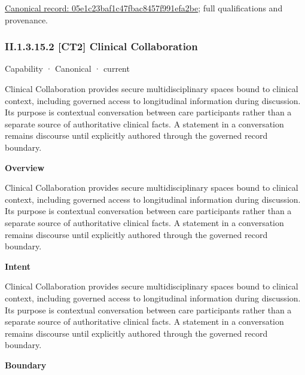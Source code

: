 {\footnotesize \href{../../../../continuum/strategy/capability/feature/05e1c23baf1c47fbac8457f991efa2be.md}{Canonical record: 05e1c23baf1c47fbac8457f991efa2be}; full qualifications and provenance.}\par
\subsubsection*{II.1.3.15.2 [CT2] Clinical Collaboration}
\label{navigation:II.1.3.15.2}

\label{element:e6429225463a44d39f82e490e254e5d4}
{\small Capability · Canonical · current}\par

Clinical Collaboration provides secure multidisciplinary spaces bound to clinical context, including governed access to longitudinal information during discussion. Its purpose is contextual conversation between care participants rather than a separate source of authoritative clinical facts. A statement in a conversation remains discourse until explicitly authored through the governed record boundary.



\textbf{Overview}



Clinical Collaboration provides secure multidisciplinary spaces bound to clinical context, including governed access to longitudinal information during discussion. Its purpose is contextual conversation between care participants rather than a separate source of authoritative clinical facts. A statement in a conversation remains discourse until explicitly authored through the governed record boundary.



\textbf{Intent}



Clinical Collaboration provides secure multidisciplinary spaces bound to clinical context, including governed access to longitudinal information during discussion. Its purpose is contextual conversation between care participants rather than a separate source of authoritative clinical facts. A statement in a conversation remains discourse until explicitly authored through the governed record boundary.



\textbf{Boundary}



